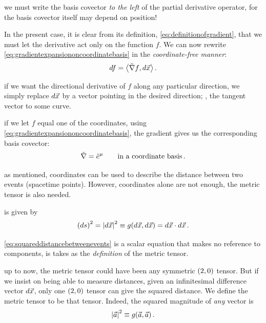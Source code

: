  we must write the basis covector \emph{to the left} of the partial derivative operator, for the basis covector itself may depend on position! 

 In the present case, it is clear from its definition, \cref{eq:definitionofgradient}, that we must let the derivative act only on the function $f$. We can now rewrite \cref{eq:gradientexpansiononcoordinatebasis} in the \emph{coordinate-free manner}:
%
\begin{equation}\label{eq:coordinatefreegradient}
  df = \sprod{\gradcov f}{d\vec\pos}\,.
\end{equation}

 if we want the directional derivative of $f$ along any particular direction, we simply replace $d\vec{x}$ by a vector pointing in the desired direction; \eg, the tangent vector to some curve.

 if we let $f$ equal one of the coordinates, using \cref{eq:gradientexpansiononcoordinatebasis}, the gradient gives us the corresponding basis covector:
%
\begin{equation}\label{eq:coordinatebasiselements}
  \gradcov = \tbcov\mu\qquad\text{in a coordinate basis}\,.
\end{equation}

 as mentioned, coordinates can be used to describe the distance between two events (spacetime points). However, coordinates alone are not enough, the metric tensor is also needed.

 is given by
%
\begin{equation}\label{eq:squareddistancebetweenevents}
  \sqdifdist = \norm{d\vec\pos}^2
             \defas \metric\vat{d\vec\pos,d\vec\pos}
             = d\vec\pos\iprod d\vec\pos\,.
\end{equation}

 \cref{eq:squareddistancebetweenevents} is a scalar equation that makes no reference to components, is takes as the \emph{definition} of the metric tensor.

 up to now, the metric tensor could have been any symmetric $\torder 20$ tensor. But if we insist on being able to measure distances, given an infinitesimal difference vector $d\vec{x}$, only one $\torder 20$ tensor can give the squared distance. We define the metric tensor to be that tensor. Indeed, the squared magnitude of \emph{any} vector is
%
\begin{equation*}
  \norm{\vec a}^2 \defas \metric\vat{\vec a, \vec a}\,.
\end{equation*}

